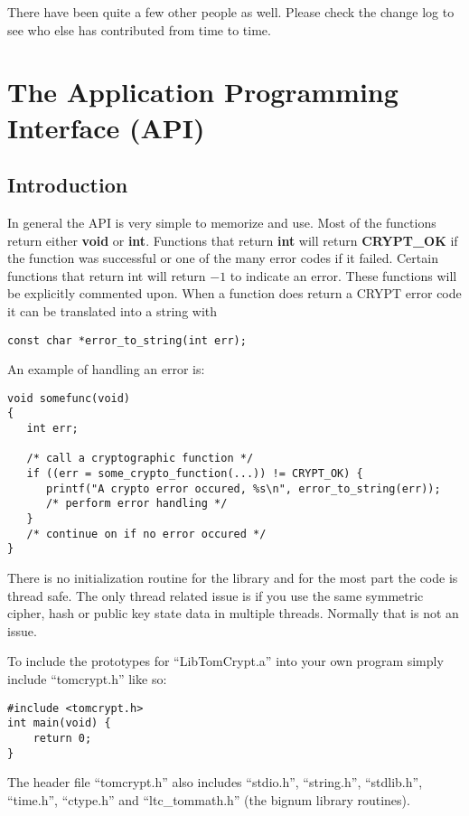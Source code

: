 \documentclass[a4paper]{book}
\begin{document}
There have been quite a few other people as well.  Please check the change log to see who else has contributed from
time to time.

\chapter{The Application Programming Interface (API)}
\section{Introduction}
 

In general the API is very simple to memorize and use.  Most of the functions return either {\bf void} or {\bf int}.  Functions
that return {\bf int} will return {\bf CRYPT\_OK} if the function was successful or one of the many error codes 
if it failed.  Certain functions that return int will return $-1$ to indicate an error.  These functions will be explicitly
commented upon.  When a function does return a CRYPT error code it can be translated into a string with

\begin{verbatim}
const char *error_to_string(int err);
\end{verbatim}

An example of handling an error is:
\begin{verbatim}
void somefunc(void)
{
   int err;
   
   /* call a cryptographic function */
   if ((err = some_crypto_function(...)) != CRYPT_OK) {
      printf("A crypto error occured, %s\n", error_to_string(err));
      /* perform error handling */
   }
   /* continue on if no error occured */
}
\end{verbatim}

There is no initialization routine for the library and for the most part the code is thread safe.  The only thread
related issue is if you use the same symmetric cipher, hash or public key state data in multiple threads.  Normally
that is not an issue.

To include the prototypes for ``LibTomCrypt.a'' into your own program simply include ``tomcrypt.h'' like so:
\begin{verbatim}
#include <tomcrypt.h>
int main(void) {
    return 0;
}
\end{verbatim}

The header file ``tomcrypt.h'' also includes ``stdio.h'', ``string.h'', ``stdlib.h'', ``time.h'', ``ctype.h'' and 
``ltc\_tommath.h'' (the bignum library routines).
\end{document}
